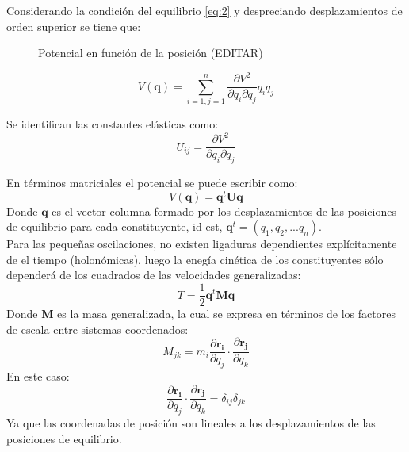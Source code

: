 Considerando la condici\'{o}n del equilibrio \eqref{eq:2} y despreciando desplazamientos de orden superior se tiene que:

\begin{figure}
\centering%
%
\caption{Potencial en funci\'{o}n de la posici\'{o}n (EDITAR)} \label{fig:pot}
\end{figure}

\begin{equation}
V(\mathbf{q})=\sum_{i=1,j=1}^{n}\frac{\partial V^2 }{\partial q_i\partial q_j}q_i q_j
\end{equation}\label{eq:3}

Se identifican las constantes el\'{a}sticas como:
\begin{equation}
U_{ij}=\frac{\partial V^2 }{\partial q_i\partial q_j}
\end{equation}\label{eq:4}

En t\'{e}rminos matriciales el potencial se puede escribir como:
\begin{equation}
V(\mathbf{q})=\mathbf{q}^t\mathbf{U}\mathbf{q}
\end{equation}\label{eq:5}
Donde $\mathbf{q}$ es el vector columna formado por los desplazamientos de las posiciones de equilibrio para cada constituyente, id est, $\mathbf{q}^t=(q_1,q_2,...q_n)$.\\

Para las peque\~{n}as oscilaciones, no existen ligaduras dependientes expl\'{i}citamente de el tiempo (holon\'{o}micas), luego la eneg\'{i}a cin\'{e}tica de los constituyentes s\'{o}lo depender\'{a} de los cuadrados de las velocidades generalizadas:
\begin{equation}
T=\frac{1}{2}\mathbf{q}^t\mathbf{M}\mathbf{q}
\end{equation}\label{eq:6}
Donde $\mathbf{M}$ es la masa generalizada, la cual se expresa en t\'{e}rminos de los factores de escala entre sistemas coordenados:
\begin{equation}
M_{jk}=m_{i}\frac{\partial \mathbf{r_{i}} }{\partial q_j}\cdot\frac{\partial \mathbf{r_{j}} }{\partial q_k}
\end{equation}\label{eq:7}
En este caso:
\begin{equation}
\frac{\partial \mathbf{r_{i}} }{\partial q_j}\cdot\frac{\partial \mathbf{r_{j}} }{\partial q_k}=\delta_{ij}\delta_{jk}
\end{equation}\label{eq:8}
Ya que las coordenadas de posici\'{o}n son lineales a los desplazamientos de las posiciones de equilibrio.\\


